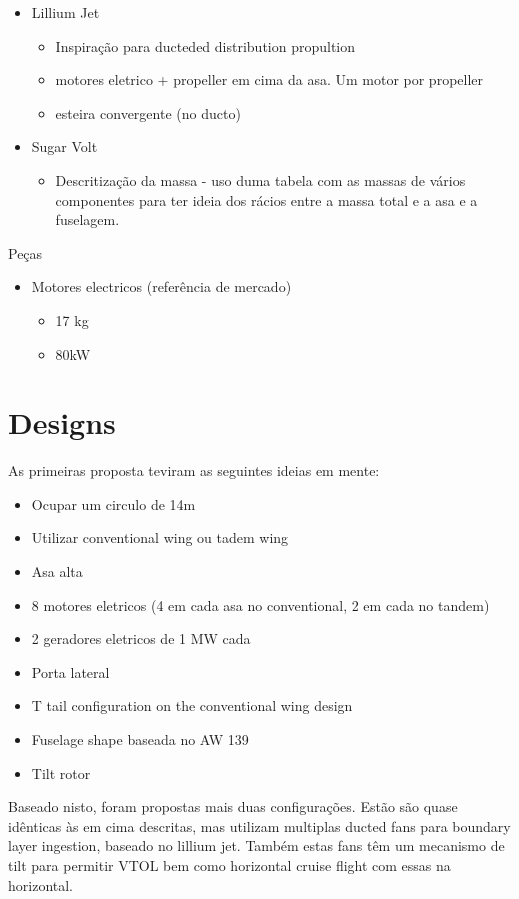 \begin{itemize}
        \item Lillium Jet
        \begin{itemize}
            \item Inspiração para ducteded distribution propultion
            \item motores eletrico + propeller em cima da asa. Um motor por propeller
            \item esteira convergente (no ducto)
        \end{itemize}
        \item Sugar Volt
        \begin{itemize}
            \item Descritização da massa - uso duma tabela com as massas de vários componentes para ter ideia dos rácios entre a massa total e a asa e a fuselagem.
        \end{itemize}
    \end{itemize}
Peças
\begin{itemize}
    \item Motores electricos (referência de mercado)
    \begin{itemize}
        \item 17 kg
        \item 80kW
    \end{itemize}
\end{itemize}
\section{Designs}
As primeiras proposta teviram as seguintes ideias em mente:
\begin{itemize}
    \item Ocupar um circulo de 14m
    \item Utilizar conventional wing ou tadem wing
    \item Asa alta
    \item 8 motores eletricos (4 em cada asa no conventional, 2 em cada no tandem)
    \item 2 geradores eletricos de 1 MW cada
    \item Porta lateral
    \item T tail configuration on the conventional wing design
    \item Fuselage shape baseada no AW 139
    \item Tilt rotor
\end{itemize}

Baseado nisto, foram propostas mais duas configurações. Estão são quase idênticas às em cima descritas, mas utilizam multiplas ducted fans para boundary layer ingestion, baseado no lillium jet. Também estas fans têm um mecanismo de tilt para permitir VTOL bem como horizontal cruise flight com essas na horizontal.
